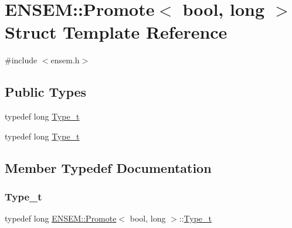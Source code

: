 \hypertarget{structENSEM_1_1Promote_3_01bool_00_01long_01_4}{}\section{E\+N\+S\+EM\+:\+:Promote$<$ bool, long $>$ Struct Template Reference}
\label{structENSEM_1_1Promote_3_01bool_00_01long_01_4}


{\ttfamily \#include $<$ensem.\+h$>$}

\subsection*{Public Types}
\begin{DoxyCompactItemize}
\item 
typedef long \mbox{\hyperlink{structENSEM_1_1Promote_3_01bool_00_01long_01_4_a92d4af8adfcc1f69cde4f02b85f783c9}{Type\+\_\+t}}
\item 
typedef long \mbox{\hyperlink{structENSEM_1_1Promote_3_01bool_00_01long_01_4_a92d4af8adfcc1f69cde4f02b85f783c9}{Type\+\_\+t}}
\end{DoxyCompactItemize}


\subsection{Member Typedef Documentation}
\mbox{\label{structENSEM_1_1Promote_3_01bool_00_01long_01_4_a92d4af8adfcc1f69cde4f02b85f783c9}} 
\subsubsection{\texorpdfstring{Type\_t}{Type\_t}\hspace{0.1cm}{\footnotesize\ttfamily [1/2]}}
{\footnotesize\ttfamily typedef long \mbox{\hyperlink{structENSEM_1_1Promote}{E\+N\+S\+E\+M\+::\+Promote}}$<$ bool, long $>$\+::\mbox{\hyperlink{structENSEM_1_1Promote_3_01bool_00_01long_01_4_a92d4af8adfcc1f69cde4f02b85f783c9}{Type\+\_\+t}}}

\mbox{\label{structENSEM_1_1Promote_3_01bool_00_01long_01_4_a92d4af8adfcc1f69cde4f02b85f783c9}} 
